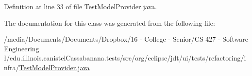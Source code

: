 Definition at line 33 of file TestModelProvider.java.



The documentation for this class was generated from the following file:\begin{DoxyCompactItemize}
\item 
/media/Documents/Documents/Dropbox/16 -\/ College -\/ Senior/CS 427 -\/ Software Engineering I/edu.illinois.canistelCassabanana.tests/src/org/eclipse/jdt/ui/tests/refactoring/infra/\hyperlink{TestModelProvider_8java}{TestModelProvider.java}\end{DoxyCompactItemize}

